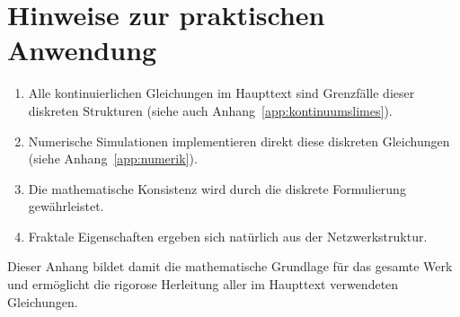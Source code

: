 \section{Hinweise zur praktischen Anwendung}
\label{app:mathematik_praxis}

\begin{enumerate}
    \item Alle kontinuierlichen Gleichungen im Haupttext sind Grenzfälle dieser diskreten Strukturen (siehe auch Anhang~\ref{app:kontinuumslimes}).
    \item Numerische Simulationen implementieren direkt diese diskreten Gleichungen (siehe Anhang~\ref{app:numerik}).
    \item Die mathematische Konsistenz wird durch die diskrete Formulierung gewährleistet.
    \item Fraktale Eigenschaften ergeben sich natürlich aus der Netzwerkstruktur.
\end{enumerate}

Dieser Anhang bildet damit die mathematische Grundlage für das gesamte Werk und ermöglicht die rigorose Herleitung aller im Haupttext verwendeten Gleichungen.